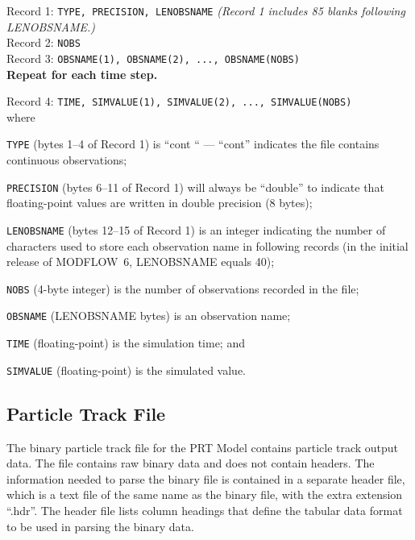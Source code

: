 \vspace{5mm}
\noindent Record 1: \texttt{TYPE, PRECISION, LENOBSNAME} \textit{(Record 1 includes 85 blanks following LENOBSNAME.)} \\
\noindent Record 2: \texttt{NOBS} \\
\noindent Record 3: \texttt{OBSNAME(1),  OBSNAME(2), ..., OBSNAME(NOBS)} \\

\vspace{12pt}
\noindent \textbf{Repeat for each time step.}

\vspace{12pt}
\noindent Record 4: \texttt{TIME, SIMVALUE(1), SIMVALUE(2), ..., SIMVALUE(NOBS)} \\
 
\vspace{12pt}
\noindent where

\begin{description} \itemsep0pt \parskip0pt 
\item \texttt{TYPE} (bytes 1--4 of Record 1) is ``cont `` ---  ``cont'' indicates the file contains continuous observations;
\item \texttt{PRECISION} (bytes 6--11 of Record 1) will always be ``double'' to indicate that floating-point values are written in double precision (8 bytes);
\item \texttt{LENOBSNAME} (bytes 12--15 of Record 1) is an integer indicating the number of characters used to store each observation name in following records (in the initial release of MODFLOW~6, LENOBSNAME equals 40);
\item \texttt{NOBS} (4-byte integer) is the number of observations recorded in the file;
\item \texttt{OBSNAME} (LENOBSNAME bytes) is an observation name;
\item \texttt{TIME} (floating-point) is the simulation time; and
\item \texttt{SIMVALUE} (floating-point) is the simulated value.
\end{description}


\newpage
\subsection{Particle Track File}

The binary particle track file for the PRT Model contains particle track output data.  The file
contains raw binary data and does not contain headers.  The information needed to parse the binary
file is contained in a separate header file, which is a text file of the same name as the binary
file, with the extra extension ``.hdr''.  The header file lists column headings that define the
tabular data format to be used in parsing the binary data.

